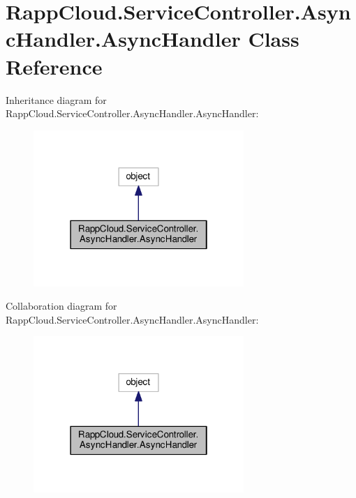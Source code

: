 \hypertarget{classRappCloud_1_1ServiceController_1_1AsyncHandler_1_1AsyncHandler}{\section{Rapp\-Cloud.\-Service\-Controller.\-Async\-Handler.\-Async\-Handler Class Reference}
\label{classRappCloud_1_1ServiceController_1_1AsyncHandler_1_1AsyncHandler}
}


Inheritance diagram for Rapp\-Cloud.\-Service\-Controller.\-Async\-Handler.\-Async\-Handler\-:
\nopagebreak
\begin{figure}[H]
\begin{center}
\leavevmode
\includegraphics[width=226pt]{classRappCloud_1_1ServiceController_1_1AsyncHandler_1_1AsyncHandler__inherit__graph}
\end{center}
\end{figure}


Collaboration diagram for Rapp\-Cloud.\-Service\-Controller.\-Async\-Handler.\-Async\-Handler\-:
\nopagebreak
\begin{figure}[H]
\begin{center}
\leavevmode
\includegraphics[width=226pt]{classRappCloud_1_1ServiceController_1_1AsyncHandler_1_1AsyncHandler__coll__graph}
\end{center}
\end{figure}
